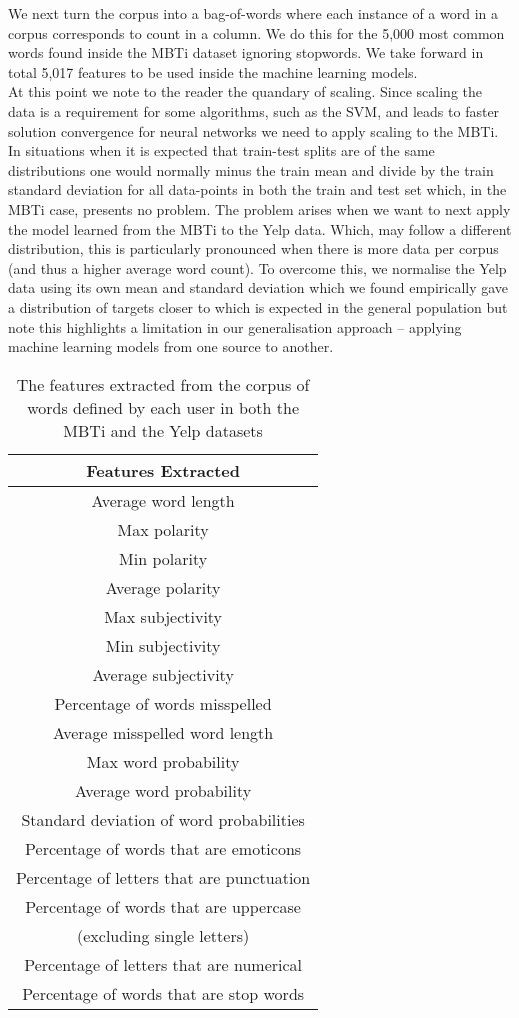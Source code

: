 \documentclass[sigconf, nonacm]{acmart}
\begin{document}
We next turn the corpus into a bag-of-words where each instance of a word in a corpus corresponds to count in a column. We do this for the 5,000 most common words found inside the MBTi dataset ignoring stopwords. We take forward in total 5,017 features to be used inside the machine learning models. \\

At this point we note to the reader the quandary of scaling. Since scaling the data is a requirement for some algorithms, such as the SVM, and leads to faster solution convergence for neural networks \cite{lecun2012efficient} we need to apply scaling to the MBTi. In situations when it is expected that train-test splits are of the same distributions one would normally  minus the train mean and divide by the train standard deviation for all data-points in both the train and test set which, in the MBTi case, presents no problem. The problem arises when we want to next apply the model learned from the MBTi to the Yelp data. Which, may follow a different distribution, this is particularly pronounced when there is more data per corpus (and thus a higher average word count). To overcome this, we normalise the Yelp data using its own mean and standard deviation which we found empirically gave a distribution of targets closer to which is expected in the general population but note this highlights a limitation in our generalisation approach -- applying machine learning models from one source to another. 

\begin{table}
\begin{tabular}{ | c | }
\hline
Features Extracted  \\
\hline 
Average word length  \\
Max polarity \\
Min polarity \\
Average polarity \\
Max subjectivity \\
Min subjectivity \\
Average subjectivity \\
Percentage of words misspelled \\
Average misspelled word length \\
Max word probability \\
Average word probability \\
Standard deviation of word probabilities \\
Percentage of words that are emoticons  \\
Percentage of letters that are punctuation \\
Percentage of words that are uppercase \\ (excluding single letters) \\
Percentage of letters that are numerical \\
Percentage of words that are stop words \\
\hline 
\end{tabular}
\label{feature_engineering}
\caption{The features extracted from the corpus of words defined by each user in both the MBTi and the Yelp datasets}
\end{table} 
\end{document}
